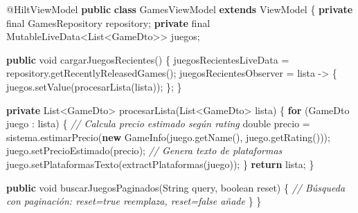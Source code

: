 \documentclass[
  spanish,
  11pt,
  paper=a4,
  ,captions=tableheading
]{scrartcl}
\newenvironment{Shaded}{}{}
\newcommand{\AttributeTok}[1]{\textcolor[rgb]{0.49,0.56,0.16}{#1}}
\newcommand{\BuiltInTok}[1]{\textcolor[rgb]{0.00,0.50,0.00}{#1}}
\newcommand{\CommentTok}[1]{\textcolor[rgb]{0.38,0.63,0.69}{\textit{#1}}}
\newcommand{\ControlFlowTok}[1]{\textcolor[rgb]{0.00,0.44,0.13}{\textbf{#1}}}
\newcommand{\DataTypeTok}[1]{\textcolor[rgb]{0.56,0.13,0.00}{#1}}
\newcommand{\FunctionTok}[1]{\textcolor[rgb]{0.02,0.16,0.49}{#1}}
\newcommand{\KeywordTok}[1]{\textcolor[rgb]{0.00,0.44,0.13}{\textbf{#1}}}
\newcommand{\NormalTok}[1]{#1}
\newcommand{\OperatorTok}[1]{\textcolor[rgb]{0.40,0.40,0.40}{#1}}
\begin{document}
\begin{Shaded}
\begin{Highlighting}[]
\AttributeTok{@HiltViewModel}
\KeywordTok{public} \KeywordTok{class}\NormalTok{ GamesViewModel }\KeywordTok{extends}\NormalTok{ ViewModel }\OperatorTok{\{}
    \KeywordTok{private} \DataTypeTok{final}\NormalTok{ GamesRepository repository}\OperatorTok{;}
    \KeywordTok{private} \DataTypeTok{final}\NormalTok{ MutableLiveData}\OperatorTok{\textless{}}\BuiltInTok{List}\OperatorTok{\textless{}}\NormalTok{GameDto}\OperatorTok{\textgreater{}\textgreater{}}\NormalTok{ juegos}\OperatorTok{;}

    \KeywordTok{public} \DataTypeTok{void} \FunctionTok{cargarJuegosRecientes}\OperatorTok{()} \OperatorTok{\{}
\NormalTok{        juegosRecientesLiveData }\OperatorTok{=}\NormalTok{ repository}\OperatorTok{.}\FunctionTok{getRecentlyReleasedGames}\OperatorTok{();}
\NormalTok{        juegosRecientesObserver }\OperatorTok{=}\NormalTok{ lista }\OperatorTok{{-}\textgreater{}} \OperatorTok{\{}
\NormalTok{            juegos}\OperatorTok{.}\FunctionTok{setValue}\OperatorTok{(}\FunctionTok{procesarLista}\OperatorTok{(}\NormalTok{lista}\OperatorTok{));}
        \OperatorTok{\};}
    \OperatorTok{\}}

    \KeywordTok{private} \BuiltInTok{List}\OperatorTok{\textless{}}\NormalTok{GameDto}\OperatorTok{\textgreater{}} \FunctionTok{procesarLista}\OperatorTok{(}\BuiltInTok{List}\OperatorTok{\textless{}}\NormalTok{GameDto}\OperatorTok{\textgreater{}}\NormalTok{ lista}\OperatorTok{)} \OperatorTok{\{}
        \ControlFlowTok{for} \OperatorTok{(}\NormalTok{GameDto juego }\OperatorTok{:}\NormalTok{ lista}\OperatorTok{)} \OperatorTok{\{}
            \CommentTok{// Calcula precio estimado según rating}
            \DataTypeTok{double}\NormalTok{ precio }\OperatorTok{=}\NormalTok{ sistema}\OperatorTok{.}\FunctionTok{estimarPrecio}\OperatorTok{(}\KeywordTok{new} \FunctionTok{GameInfo}\OperatorTok{(}\NormalTok{juego}\OperatorTok{.}\FunctionTok{getName}\OperatorTok{(),}\NormalTok{ juego}\OperatorTok{.}\FunctionTok{getRating}\OperatorTok{()));}
\NormalTok{            juego}\OperatorTok{.}\FunctionTok{setPrecioEstimado}\OperatorTok{(}\NormalTok{precio}\OperatorTok{);}
            \CommentTok{// Genera texto de plataformas}
\NormalTok{            juego}\OperatorTok{.}\FunctionTok{setPlataformasTexto}\OperatorTok{(}\FunctionTok{extractPlataformas}\OperatorTok{(}\NormalTok{juego}\OperatorTok{));}
        \OperatorTok{\}}
        \ControlFlowTok{return}\NormalTok{ lista}\OperatorTok{;}
    \OperatorTok{\}}

    \KeywordTok{public} \DataTypeTok{void} \FunctionTok{buscarJuegosPaginados}\OperatorTok{(}\BuiltInTok{String}\NormalTok{ query}\OperatorTok{,} \DataTypeTok{boolean}\NormalTok{ reset}\OperatorTok{)} \OperatorTok{\{}
        \CommentTok{// Búsqueda con paginación: reset=true reemplaza, reset=false añade}
    \OperatorTok{\}}
\OperatorTok{\}}
\end{Highlighting}
\end{Shaded}
\end{document}
